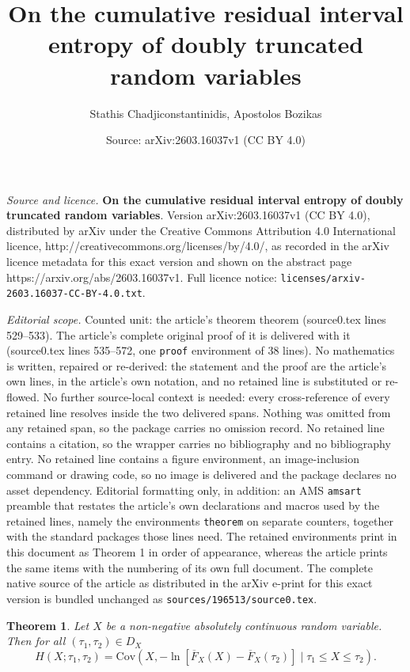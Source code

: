 \documentclass[10pt,a4paper]{amsart}
\title{\textbf{On the cumulative residual interval entropy of doubly truncated random variables}}
\author{Stathis Chadjiconstantinidis, Apostolos Bozikas}
\date{Source: arXiv:2603.16037v1 (CC BY 4.0)}
\newtheorem{theorem}{Theorem}
\begin{document}
\maketitle

\noindent\emph{Source and licence.} \textbf{On the cumulative residual interval entropy of doubly truncated random variables}. Version arXiv:2603.16037v1 (CC BY 4.0), distributed by arXiv under the Creative Commons Attribution 4.0 International licence, http://creativecommons.org/licenses/by/4.0/, as recorded in the arXiv licence metadata for this exact version and shown on the abstract page https://arxiv.org/abs/2603.16037v1. Full licence notice: \texttt{licenses/arxiv-2603.16037-CC-BY-4.0.txt}.\par\smallskip

\noindent\textit{Editorial scope.} Counted unit: the article's theorem theorem (source0.tex lines 529--533). The article's complete original proof of it is delivered with it (source0.tex lines 535--572, one \texttt{proof} environment of 38 lines). No mathematics is written, repaired or re-derived: the statement and the proof are the article's own lines, in the article's own notation, and no retained line is substituted or re-flowed.  No further source-local context is needed: every cross-reference of every retained line resolves inside the two delivered spans.  Nothing was omitted from any retained span, so the package carries no omission record.  No retained line contains a citation, so the wrapper carries no bibliography and no bibliography entry.  No retained line contains a figure environment, an image-inclusion command or drawing code, so no image is delivered and the package declares no asset dependency.  Editorial formatting only, in addition: an AMS \texttt{amsart} preamble that restates the article's own declarations and macros used by the retained lines, namely the environments \texttt{theorem} on separate counters, together with the standard packages those lines need.  The retained environments print in this document as Theorem 1 in order of appearance, whereas the article prints the same items with the numbering of its own full document.  The complete native source of the article as distributed in the arXiv e-print for this exact version is bundled unchanged as \texttt{sources/196513/source0.tex}.
\begin{theorem} Let $X$ be a non-negative absolutely continuous random variable. Then for all $(\tau_1,\tau_2) \in D_X$
	\begin{equation}
		\textstyle H(X;\tau_1,\tau_2) = \mathrm{Cov}\left(X, -\ln[\overline{F}_X(X)-\overline{F}_X(\tau_2)] \mid \tau_1 \leq X \leq \tau_2 \right).
	\end{equation}
\end{theorem}
\end{document}
